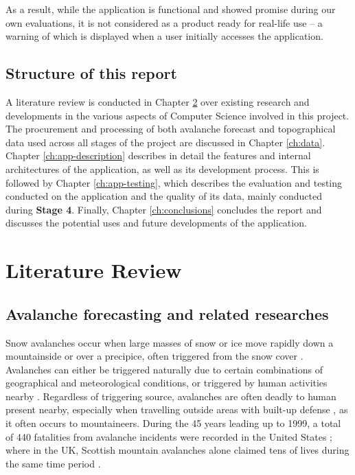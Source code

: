 \documentclass[openany]{UoYCSproject}
\begin{document}
As a result, while the application is functional and showed promise during our own evaluations, it is not considered as a product ready for real-life use -- a warning of which is displayed when a user initially accesses the application.

\section{Structure of this report}

A literature review is conducted in Chapter \ref{ch:lit-review} over existing research and developments in the various aspects of Computer Science involved in this project. The procurement and processing of both avalanche forecast and topographical data used across all stages of the project are discussed in Chapter \ref{ch:data}. Chapter \ref{ch:app-description} describes in detail the features and internal architectures of the application, as well as its development process. This is followed by Chapter \ref{ch:app-testing}, which describes the evaluation and testing conducted on the application and the quality of its data, mainly conducted during \textbf{Stage 4}. Finally, Chapter \ref{ch:conclusions} concludes the report and discusses the potential uses and future developments of the application.

\chapter{Literature Review} \label{ch:lit-review}

\section{Avalanche forecasting and related researches}

Snow avalanches occur when large masses of snow or ice move rapidly down a mountainside or over a precipice, often triggered from the snow cover \cite[p. 1]{91097820150101}. Avalanches can either be triggered naturally due to certain combinations of geographical \cite[p. 17]{91097820150101} and meteorological \cite[p. 23]{91097820150101} conditions, or triggered by human activities nearby \cite{schweizer2001characteristics}. Regardless of triggering source, avalanches are often deadly to human present nearby, especially when travelling outside areas with built-up defense \cite{91097820150101}, as it often occurs to mountaineers. During the 45 years leading up to 1999, a total of 440 fatalities from avalanche incidents were recorded in the United States \cite{PAGE1999146}; where in the UK, Scottish mountain avalanches alone claimed tens of lives during the same time period \cite{scottish-avalanches}.
\end{document}
